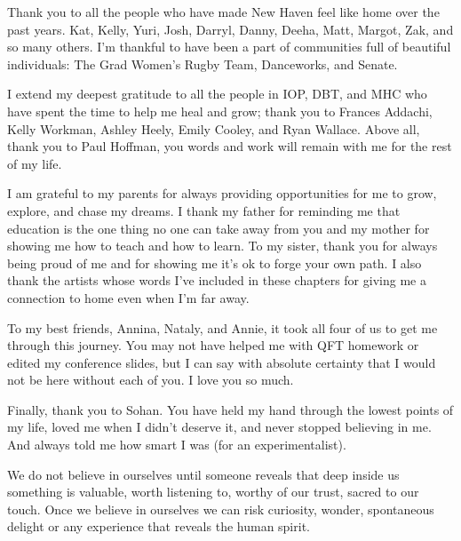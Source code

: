 Thank you to all the people who have made New Haven feel like home over the past years. Kat, Kelly, Yuri, Josh, Darryl, Danny, Deeha, Matt, Margot, Zak, and so many others. I'm thankful to have been a part of communities full of beautiful individuals: The Grad Women's Rugby Team, Danceworks, and Senate.

I extend my deepest gratitude to all the people in IOP, DBT, and MHC who have spent the time to help me heal and grow; thank you to Frances Addachi, Kelly Workman, Ashley Heely, Emily Cooley, and Ryan Wallace. Above all, thank you to Paul Hoffman, you words and work will remain with me for the rest of my life.

I am grateful to my parents for always providing opportunities for me to grow, explore, and chase my dreams. I thank my father for reminding me that education is the one thing no one can take away from you and my mother for showing me how to teach and how to learn. To my sister, thank you for always being proud of me and for showing me it's ok to forge your own path. I also thank the artists whose words I've included in these chapters for giving me a connection to home even when I'm far away. 

To my best friends, Annina, Nataly, and Annie, it took all four of us to get me through this journey. You may not have helped me with QFT homework or edited my conference slides, but I can say with absolute certainty that I would not be here without each of you. I love you so much. 

Finally, thank you to Sohan. You have held my hand through the lowest points of my life, loved me when I didn't deserve it, and never stopped believing in me. And always told me how smart I was (for an experimentalist). 

\begin{displayquote}
We do not believe in ourselves until someone reveals that deep inside us something is valuable, worth listening to, worthy of our trust, sacred to our touch. Once we believe in ourselves we can risk curiosity, wonder, spontaneous delight or any experience that reveals the human spirit.
\end{displayquote}